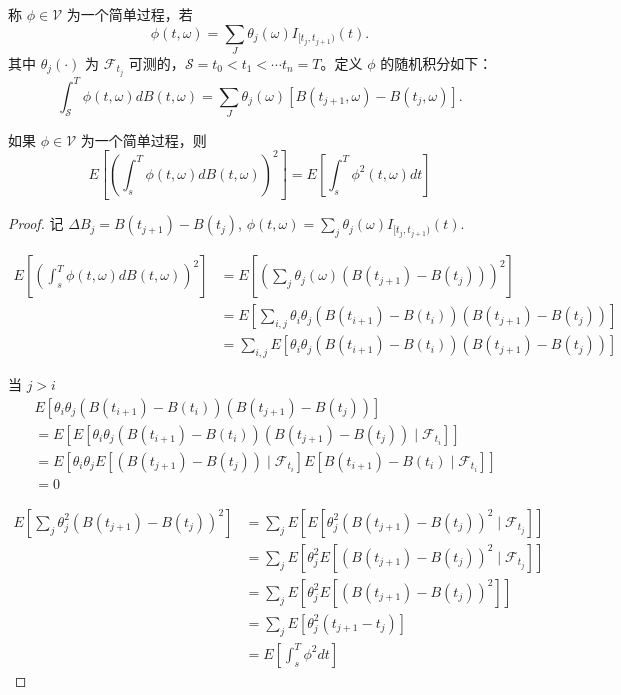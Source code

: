 \documentclass[lang=cn,10pt,thmcnt=section]{elegantbook}
\begin{document}
\begin{definition}
	称 \( \phi \in \mathcal{V} \) 为一个简单过程，若
\[
\phi(t, \omega) = \sum_J \theta_j(\omega) I_{[t_j, t_{j+1})}(t).
\]
其中 \( \theta_j(\cdot) \) 为 \( \mathcal{F}_{t_j} \) 可测的，\( \mathcal{S} = t_0 < t_1 < \cdots t_n = T \)。定义 \( \phi \) 的随机积分如下：
\[
\int_{\mathcal{S}}^T \phi(t, \omega) dB(t, \omega) = \sum_J \theta_j(\omega) [B(t_{j+1}, \omega) - B(t_j, \omega)].
\]
\end{definition}
\begin{lemma}[lto等距]
	如果 \(\phi \in \mathcal{V}\) 为一个简单过程，则
\[
E\left[\left(\int_s^T \phi(t, \omega) dB(t, \omega)\right)^2\right] = E\left[\int_s^T \phi^2(t, \omega) dt\right]
\]
\end{lemma}
\begin{proof}
	记 \(\Delta B_j = B(t_{j+1}) - B(t_j)\), \(\phi(t, \omega) = \sum_j \theta_j(\omega) I_{[t_j, t_{j+1})}(t)\).

\begin{align*}
E\left[\left(\int_s^T \phi(t, \omega) dB(t, \omega)\right)^2\right] &= E\left[\left(\sum_j \theta_j(\omega) (B(t_{j+1}) - B(t_j))\right)^2\right] \\
&= E\left[\sum_{i,j} \theta_i \theta_j (B(t_{i+1}) - B(t_i))(B(t_{j+1}) - B(t_j))\right] \\
&= \sum_{i,j} E\left[\theta_i \theta_j (B(t_{i+1}) - B(t_i))(B(t_{j+1}) - B(t_j))\right]
\end{align*}

当 \(j > i\)
\begin{align*}
&E\left[\theta_i \theta_j (B(t_{i+1}) - B(t_i))(B(t_{j+1}) - B(t_j))\right] \\
&= E\left[E\left[\theta_i \theta_j (B(t_{i+1}) - B(t_i))(B(t_{j+1}) - B(t_j)) \mid \mathcal{F}_{t_i}\right]\right] \\
&= E\left[\theta_i \theta_j E\left[(B(t_{j+1}) - B(t_j)) \mid \mathcal{F}_{t_i}\right] E[B(t_{i+1}) - B(t_i) \mid \mathcal{F}_{t_i}]\right] \\
&= 0
\end{align*}

\begin{align*}
E\left[\sum_j \theta_j^2 (B(t_{j+1}) - B(t_j))^2\right] &= \sum_j E\left[E\left[\theta_j^2 (B(t_{j+1}) - B(t_j))^2 \mid \mathcal{F}_{t_j}\right]\right] \\
&= \sum_j E\left[\theta_j^2 E\left[(B(t_{j+1}) - B(t_j))^2 \mid \mathcal{F}_{t_j}\right]\right] \\
&= \sum_j E\left[\theta_j^2 E\left[(B(t_{j+1}) - B(t_j))^2\right]\right] \\
&= \sum_j E\left[\theta_j^2 (t_{j+1} - t_j)\right] \\
&= E\left[\int_s^T \phi^2 dt\right]
\end{align*}

\end{proof}
\end{document}

